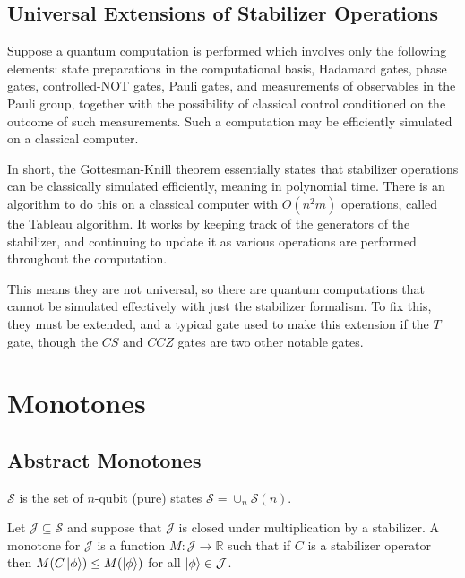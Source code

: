 \documentclass[12pt]{dalthesis}
\begin{document}
\section{Universal Extensions of Stabilizer Operations}
\begin{theorem}
Suppose a quantum computation is performed which involves only the following elements: state preparations in the computational basis, Hadamard gates, phase gates, controlled-NOT gates, Pauli gates, and measurements of observables in the Pauli group, together with the possibility of classical control conditioned on the outcome of such measurements. Such a computation may be efficiently simulated on a classical computer.
\end{theorem}

In short, the Gottesman-Knill theorem essentially states that stabilizer operations can be classically simulated efficiently, meaning in polynomial time. There is an algorithm to do this on a classical computer with $O(n^2m)$ operations, called the Tableau algorithm. It works by keeping track of the generators of the stabilizer, and continuing to update it as various operations are performed throughout the computation. 

This means they are not universal, so there are quantum computations that cannot be simulated effectively with just the stabilizer formalism. To fix this, they must be extended, and a typical gate used to make this extension if the $T$ gate, though the $CS$ and $CCZ$ gates are two other notable gates.


\chapter{Monotones}

\section{Abstract Monotones}
$\mathcal{S}$ is the set of $n$-qubit (pure) states $\mathcal{S} = \cup_n \mathcal{S}(n)$.

\begin{definition}
Let $\mathcal{J} \subseteq \mathcal{S}$ and suppose that $\mathcal{J}$ is closed under multiplication by a stabilizer. A monotone for $\mathcal{J}$ is a function $M: \mathcal{J} \rightarrow \mathbb{R}$ such that if $C$ is a stabilizer operator then $M(C\ket{\phi}) \leq M(\ket{\phi})$ for all $\ket{\phi} \in \mathcal{J}$.
\end{definition}
\end{document}
